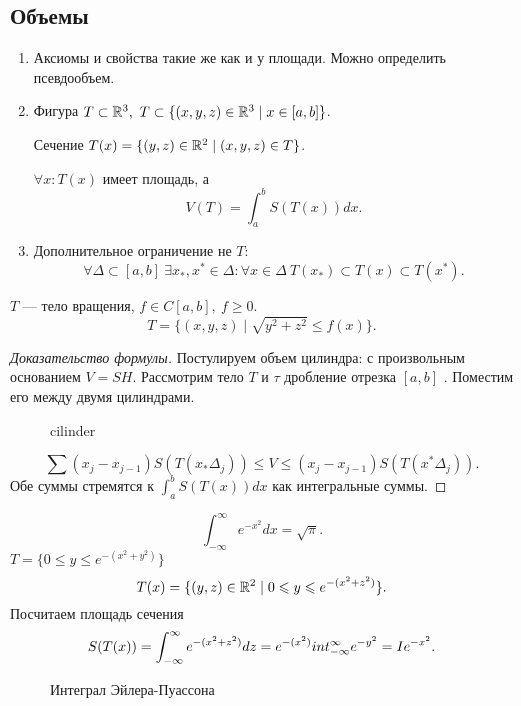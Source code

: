     \subsection{Объемы}
    \begin{enumerate}
	\item
	    Аксиомы и свойства такие же как и у площади.
	    Можно определить псевдообъем.
	\item Фигура $ T \subset \mathbb{R}^3, ~ T \subset \{(x, y, z) \in  \mathbb{R}^3 \mid x \in [a, b]\} $.

	    \begin{defn}
		Сечение $ T(x) = \{(y, z) \in \mathbb{R}^2 \mid (x, y, z) \in T \}$.
	    \end{defn}
	    $ \forall x : T(x)$ имеет площадь,
	    а \[
		V(T) = \int_{a}^{b}  S(T(x))dx
	    .\]
	\item Дополнительное ограничение не $ T$:
	    \[
		\forall  \Delta \subset [a, b] ~ \exists x_{*} , x^{*} \in  \Delta  : \forall x \in  \Delta ~ T(x_{*}) \subset T(x) \subset T(x^{*})
	    .\]
    \end{enumerate}
    \begin{ex}
	$ T$ --- тело вращения, $ f \in  C[a, b], ~ f \ge  0$.
	\[
	    T = \{(x, y, z) \mid \sqrt {y^2 + z^2} \le f(x) \}
	.\]
    \end{ex}
    \begin{proof}[Доказательство формулы]
	Постулируем объем цилиндра: с произвольным основанием $ V = S H$.
	Рассмотрим тело $ T$ и $ \tau$ дробление отрезка $[a, b]$ . Поместим его между двумя цилиндрами.
	\begin{figure}[ht]
	    \centering
	    \caption{cilinder}
	    \label{fig:cilinder}
	\end{figure}
	\[
	    \sum (x_j - x_{j-1}) S(T(x_{*} \Delta_j) )\le V \le (x_j - x_{j-1}) S(T(x^{*} \Delta_j))
	.\]
	Обе суммы стремятся к $ \int_{a}^{b} S(T(x))dx $ как интегральные суммы.
    \end{proof}
    \begin{ex}
	\[
	    \int_{-\infty}^{\infty} e^{-x^2} dx = \sqrt{\pi}
	.\]
	$ T = \{0 \le y \le e^{-(x^2+y^2)}\}$
	\[
	    T(x) = \{ (y, z) \in  \mathbb{R}^2 \mid 0 \leqslant  y \leqslant  e ^{-(x^2 +z^2)}\}
	.\]
	Посчитаем площадь сечения
	\[
	    S(T(x)) = \int_{-\infty}^{\infty} e^{-(x^2+z^2) } dz = e ^{-(x^2)} \\int_{-\infty}^{\infty} e ^{-y^2}  = I e^{-x^2}
	.\]
    \end{ex}
\begin{figure}[ht]
    \centering
    \caption{Интеграл Эйлера-Пуассона}
    \label{fig:eyler-pyasson}
\end{figure}
% 
